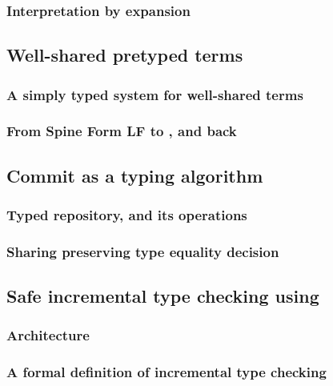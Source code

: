 \documentclass[preprint,9pt,authoryear]{sigplanconf}
\begin{document}



\subsubsection{Interpretation by expansion}



\subsection{Well-shared pretyped terms}

\subsubsection{A simply typed system for well-shared terms}

\subsubsection{From Spine Form LF to {\system}, and back}

\subsection{Commit as a typing algorithm}

\subsubsection{Typed repository, and its operations}

\subsubsection{Sharing preserving type equality decision}

\subsection{Safe incremental type checking using {\system}}

\subsubsection{Architecture}

\subsubsection{A formal definition of incremental type checking}
\end{document}
